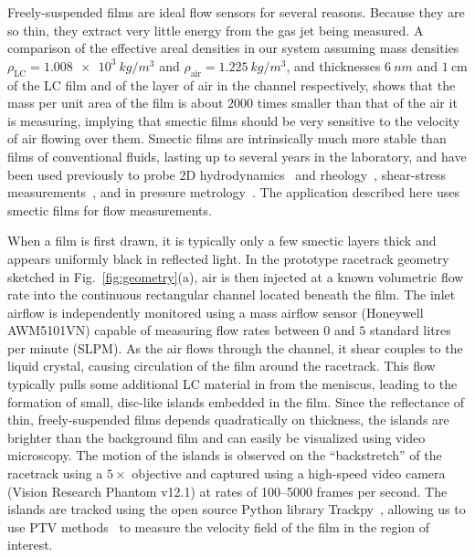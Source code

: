 \documentclass[aagreenthesis]{subfiles}
\begin{document}
Freely-suspended films are ideal flow sensors for several reasons. Because they are so thin, they extract very
little energy from the gas jet being measured. A comparison of the effective
areal densities in our system assuming mass densities
$\rho_\text{LC}=\SI{1.008e3}{kg/m^3}$ and $\rho_\text{air} = \SI{1.225}{kg/m^3}$, and
thicknesses $\SI{6}{nm}$ and $\SI{1}{\centi\metre}$ of the LC film and of the
layer of air in the channel respectively, shows that the mass per unit area of
the film is about $2000$ times smaller than that of the air it is measuring,
implying that smectic films should be very sensitive to the velocity of air
flowing over them. Smectic films are intrinsically much more stable than films
of conventional fluids, lasting up to several years in the laboratory, and have been used previously to probe $2$D hydrodynamics~\cite{QiMutualDiffusionInclusions2014,KuriabovaHydrodynamicinteractionsfreely2016} and
rheology~\cite{QiActivemicrorheologysmectic2017}, shear-stress
measurements~\cite{Parmarnovelboundarylayer1991}, and in pressure
metrology~\cite{ParmarPressuresensorusing1994,YablonskiiPressuresensorbased2002}.
The application described here uses smectic films for flow
measurements.

When a film is first drawn, it is typically only a few smectic layers thick and appears uniformly black in reflected light. In the prototype racetrack geometry sketched in Fig.~\ref{fig:geometry}(a), air is then injected at a known
volumetric flow rate into the continuous rectangular channel located beneath the film. The inlet airflow is
independently  monitored using a  mass airflow sensor (Honeywell AWM5101VN) capable of measuring flow rates between $0$
and $5$ standard litres per minute (SLPM). As the air flows through the channel, it shear couples to the liquid crystal,
causing circulation of the film around the racetrack. This flow typically pulls
some additional LC material in from the meniscus,
leading to the formation of small, disc-like islands embedded in the film. Since the reflectance of thin, freely-suspended films depends quadratically on thickness\cite{RosenblattOpticaldeterminationsmectic1980}, the islands are brighter than the background film and can easily be visualized using video microscopy. The motion of the islands is observed on the ``backstretch'' of the racetrack using a $5\times$ objective and
captured using a high-speed video camera (Vision Research Phantom v12.1) at rates of \numrange[range-phrase=--]{100}{5000} frames per second. The islands are tracked using the open source
Python library Trackpy~\cite{AllantrackpyTrackpyv02018}, allowing us to use PTV
methods~\cite{DracosParticleTrackingVelocimetry1996,Adamczyk2Dimensionalparticletracking1988, AdrianParticleImageVelocimetry2011, RaffelParticleImageVelocimetry2018} to measure the velocity field of the
film in the region of interest.
\end{document}
